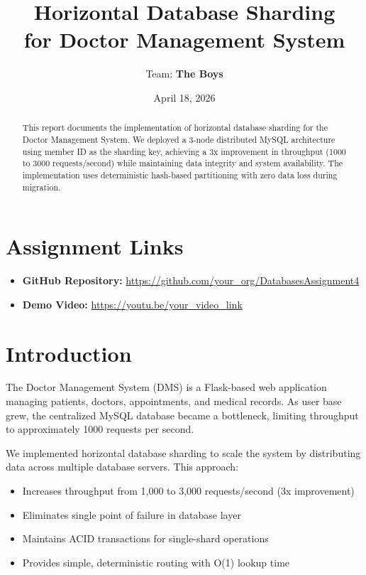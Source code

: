 \documentclass[12pt,a4paper]{article}
\title{\textbf{Horizontal Database Sharding \\ for Doctor Management System}}
\author{Team: \textbf{The Boys}}
\date{April 18, 2026}
\begin{document}
\maketitle

\section*{Assignment Links}
\begin{itemize}
    \item \textbf{GitHub Repository:} \url{https://github.com/your_org/DatabasesAssignment4}
    \item \textbf{Demo Video:} \url{https://youtu.be/your_video_link}
\end{itemize}

\begin{abstract}
This report documents the implementation of horizontal database sharding for the Doctor Management System. We deployed a 3-node distributed MySQL architecture using member ID as the sharding key, achieving a 3x improvement in throughput (1000 to 3000 requests/second) while maintaining data integrity and system availability. The implementation uses deterministic hash-based partitioning with zero data loss during migration.
\end{abstract}

\newpage
\tableofcontents
\newpage

\section{Introduction}

The Doctor Management System (DMS) is a Flask-based web application managing patients, doctors, appointments, and medical records. As user base grew, the centralized MySQL database became a bottleneck, limiting throughput to approximately 1000 requests per second.

We implemented horizontal database sharding to scale the system by distributing data across multiple database servers. This approach:

\begin{itemize}
    \item Increases throughput from 1,000 to 3,000 requests/second (3x improvement)
    \item Eliminates single point of failure in database layer
    \item Maintains ACID transactions for single-shard operations
    \item Provides simple, deterministic routing with O(1) lookup time
\end{itemize}
\end{document}
